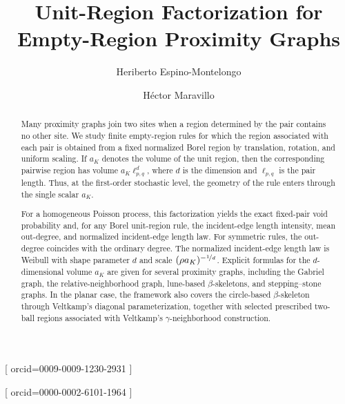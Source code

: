 \documentclass[a4paper,fleqn]{cas-dc}
\numberwithin{equation}{section}
\newcommand{\1}{\mathds{1}}
\newcommand{\ellpq}{\ell_{p,q}}
\newcommand{\0}{\mathbf{0}}
\begin{document}
\let\WriteBookmarks\relax
\def\floatpagepagefraction{1}
\def\textpagefraction{.001}


\title[mode=title]{Unit-Region Factorization for Empty-Region Proximity Graphs}

\author[1]{Heriberto {Espino-Montelongo}}[
  orcid=0009-0009-1230-2931
]
\cormark[1]

\author[2]{H\'ector {Maravillo}}[
  orcid=0000-0002-6101-1964
]




\begin{abstract}
Many proximity graphs join two sites when a region determined by the pair contains no other site. We study finite empty-region rules for which the region associated with each pair is obtained from a fixed normalized Borel region by translation, rotation, and uniform scaling. If \(a_K\) denotes the volume of the unit region, then the corresponding pairwise region has volume \(a_K\ellpq^d\), where \(d\) is the dimension and \(\ellpq\) is the pair length. Thus, at the first-order stochastic level, the geometry of the rule enters through the single scalar \(a_K\).

For a homogeneous Poisson process, this factorization yields the exact
fixed-pair void probability and, for any Borel unit-region rule, the
incident-edge length intensity, mean out-degree, and normalized
incident-edge length law. For symmetric rules, the out-degree coincides
with the ordinary degree. The normalized incident-edge length law is
Weibull with shape parameter \(d\) and scale
\((\rho a_K)^{-\nicefrac{1}{d}}\).
Explicit formulas for the \(d\)-dimensional volume \(a_K\) are given
for several proximity graphs, including the Gabriel graph, the relative-neighborhood graph,
lune-based \(\beta\)-skeletons, and stepping--stone graphs. In the
planar case, the framework also covers the circle-based
\(\beta\)-skeleton through Veltkamp's diagonal parameterization,
together with selected prescribed two-ball regions associated with
Veltkamp's \(\gamma\)-neighborhood construction.




\end{abstract}
\end{document}
